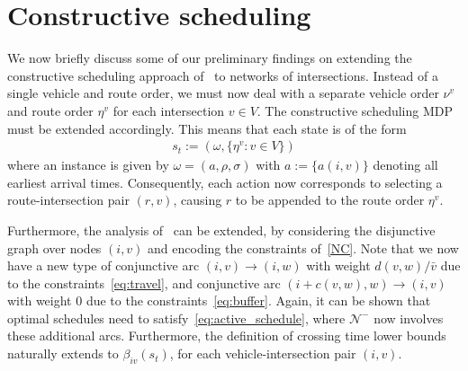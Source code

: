\documentclass{report}
\theoremstyle{definition}
\theoremstyle{plain}
\begin{document}
\begin{table}[!hp]
  \caption{Benchmarking the final MIP gap of integer programming for crossing
    time scheduling in networks of varying sizes. We record the average MIP gap
    with standard deviation over 5 instances, after running the solver for at
    most a minute on each instance. The network size is written as rows $\times$
    columns. $N = n_r (n+m)$ denotes the total number of vehicles in the network.
    For this benchmark, we used the Gurobi solver version 11.0.2 on a system
    with a 13th Gen Intel i5-13600K CPU and 32GiB of RAM.}\label{tab:milp-bench-results}
  \centering
  \hspace{-0.8em}
  
\end{table}

\section{Constructive scheduling}

We now briefly discuss some of our preliminary findings on extending the
constructive scheduling approach of~ to networks of
intersections.
%
Instead of a single vehicle and route order, we must now deal with a separate
vehicle order $\nu^v$ and route order $\eta^v$ for each intersection $v \in V$.
%
The constructive scheduling MDP must be extended accordingly. This means that
each state is  of the form
\begin{align}
  s_t := (\omega, \{ \eta^v : v \in V \})
\end{align}
where an instance is given by $\omega = (a, \rho, \sigma)$ with $a := \{ a(i,v) \}$ denoting all
earliest arrival times.
%
Consequently, each action now corresponds to selecting a route-intersection pair
$(r, v)$, causing $r$ to be appended to the route order $\eta^v$.

Furthermore, the analysis of~ can be extended, by considering the disjunctive graph over nodes $(i, v)$ and encoding the constraints of~\eqref{NC}.
%
Note that we now have a new type of conjunctive arc $(i, v)  \rightarrow (i, w)$
with weight $d(v,w) /\bar{v}$ due to the constraints~\eqref{eq:travel}, and conjunctive arc
$(i + c(v,w), w) \rightarrow (i, v)$ with weight $0$ due to the
constraints~\eqref{eq:buffer}.
%
Again, it can be shown that optimal schedules need to
satisfy~\eqref{eq:active_schedule}, where $\mathcal{N}^-$ now involves these
additional arcs. Furthermore, the definition of crossing time lower bounds
naturally extends to $\beta_{iv}(s_t)$, for each vehicle-intersection pair
$(i, v)$.
\end{document}
